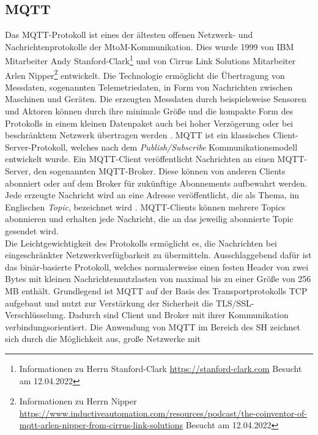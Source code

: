     \subsection{MQTT}
    \label{subsec:mqtt}
        Das \ac{MQTT}-Protokoll ist eines der ältesten offenen Netzwerk- und Nachrichtenprotokolle der 
        \ac{MtoM}-Kommunikation. 
        Dies wurde 1999 von IBM Mitarbeiter Andy Stanford-Clark\footnote{Informationen zu Herrn Stanford-Clark \url{https://stanford-clark.com} Besucht am 12.04.2022} 
        und von Cirrus Link Solutions Mitarbeiter Arlen Nipper\footnote{Informationen zu Herrn Nipper \url{https://www.inductiveautomation.com/resources/podcast/the-coinventor-of-mqtt-arlen-nipper-from-cirrus-link-solutions} Besucht am 12.04.2022} 
        entwickelt. Die Technologie ermöglicht die Übertragung von Messdaten, sogenannten Telemetriedaten, in Form von 
        Nachrichten zwischen Maschinen und Geräten. Die erzeugten Messdaten durch beispielsweise Sensoren und Aktoren 
        können durch ihre minimale Größe und die kompakte Form des Protokolls in einem kleinen Datenpaket auch bei 
        hoher Verzögerung oder bei beschränktem Netzwerk übertragen werden \cite{Naik2017}. \acs{MQTT} ist ein 
        klassisches Client-Server-Protokoll, welches nach dem \textit{Publish/Subscribe} Kommunikationsmodell 
        entwickelt wurde. Ein \acs{MQTT}-Client veröffentlicht Nachrichten an einen \acs{MQTT}-Server, den sogenannten 
        \acs{MQTT}-Broker. Diese können von anderen Clients abonniert oder auf dem Broker für zukünftige Abonnements 
        aufbewahrt werden. Jede erzeugte Nachricht wird an eine Adresse veröffentlicht, die als Thema, im Englischen \textit{Topic}, 
        bezeichnet wird \cite{Naik2017}. \acs{MQTT}-Clients können mehrere Topics abonnieren und erhalten jede Nachricht, die an 
        das jeweilig abonnierte Topic gesendet wird. 
        \\
        Die Leichtgewichtigkeit des Protokolls ermöglicht es, die Nachrichten bei eingeschränkter Netzwerkverfügbarkeit zu 
        übermitteln. Ausschlaggebend dafür ist das binär-basierte Protokoll, welches normalerweise einen festen Header von 
        zwei Bytes mit kleinen Nachrichtennutzlasten von maximal bis zu einer Größe von 256 MB \cite{Naik2017} enthält. Grundlegend 
        ist \acs{MQTT} auf der Basis des Transportprotokolls \ac{TCP} aufgebaut und nutzt zur Verstärkung der Sicherheit die 
        \ac{TLS}/\ac{SSL}-Verschlüsselung. Dadurch sind Client und Broker mit ihrer Kommunikation verbindungsorientiert. 
        Die Anwendung von \acs{MQTT} im Bereich des \acl{SH} zeichnet sich durch die Möglichkeit aus, große Netzwerke mit 
